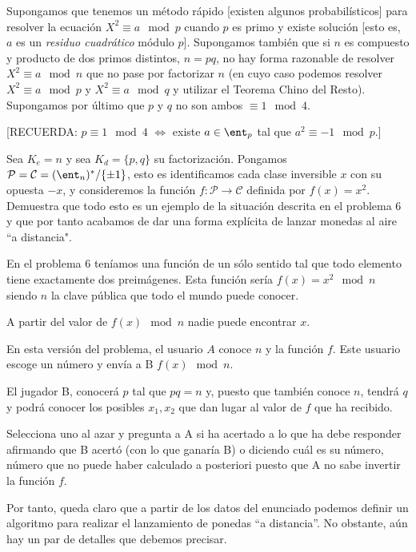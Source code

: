 \begin{problem}[8]
Supongamos que tenemos un método rápido [existen algunos
probabilísticos] para resolver la ecuación   $X^2\equiv a \mod p$
cuando $p$ es primo y existe solución [esto es, $a$ es un {\it
residuo cuadrático} módulo $p$]. Supongamos también que si $n$ es
compuesto y producto de dos primos distintos, $n=pq$, no hay forma
razonable de resolver   $X^2\equiv a \mod n$ que no pase por
factorizar $n$ (en cuyo caso podemos resolver $X^2\equiv a \mod p$
y $X^2\equiv a \mod q$ y utilizar el Teorema Chino del Resto).
Supongamos por último que $p$ y $q$ no son ambos $\equiv 1 \mod
4$. 

[RECUERDA: $p\equiv 1 \mod
4$ $\iff$ existe $a\in \ent_p$ tal que $a^2\equiv -1 \mod p$.]

Sea $K_e=n$ y sea $K_d=\{p,q\}$ su factorización. Pongamos $
\mathcal{P}= \mathcal{ C}=(\ent_n)^*/\{\pm 1\}$, esto es
identificamos cada clase inversible $x$ con su opuesta $-x$, y
consideremos la función $f:  \mathcal{P}\to  \mathcal{C}$ definida
por $f(x)=x^2$. Demuestra que todo esto es un ejemplo de la
situación descrita  en el problema 6 y que por tanto acabamos de
dar una forma explícita de lanzar monedas al aire ``a distancia".
\solution


En el problema 6 teníamos una función de un sólo sentido tal que todo elemento tiene exactamente dos preimágenes. Esta función sería $f(x)=x^2 \mod n$ siendo $n$ la clave pública que todo el mundo puede conocer.

A partir del valor de $f(x) \mod n$ nadie puede encontrar $x$.

En esta versión del problema, el usuario $A$ conoce $n$ y la función $f$. Este usuario escoge un número y envía a B $f(x)\mod n$.

El jugador B, conocerá $p$ tal que $pq=n$ y, puesto que también conoce $n$, tendrá $q$ y podrá conocer los posibles $x_1,x_2$ que dan lugar al valor de $f$ que ha recibido. 

Selecciona uno al azar y pregunta a A si ha acertado a lo que ha debe responder afirmando que B acertó (con lo que ganaría B) o diciendo cuál es su número, número que no puede haber calculado a posteriori puesto que A no sabe invertir la función $f$.

Por tanto, queda claro que a partir de los datos del enunciado podemos definir un algoritmo para realizar el lanzamiento de ponedas ``a distancia''. No obstante, aún hay un par de detalles que debemos precisar.


\end{problem}
